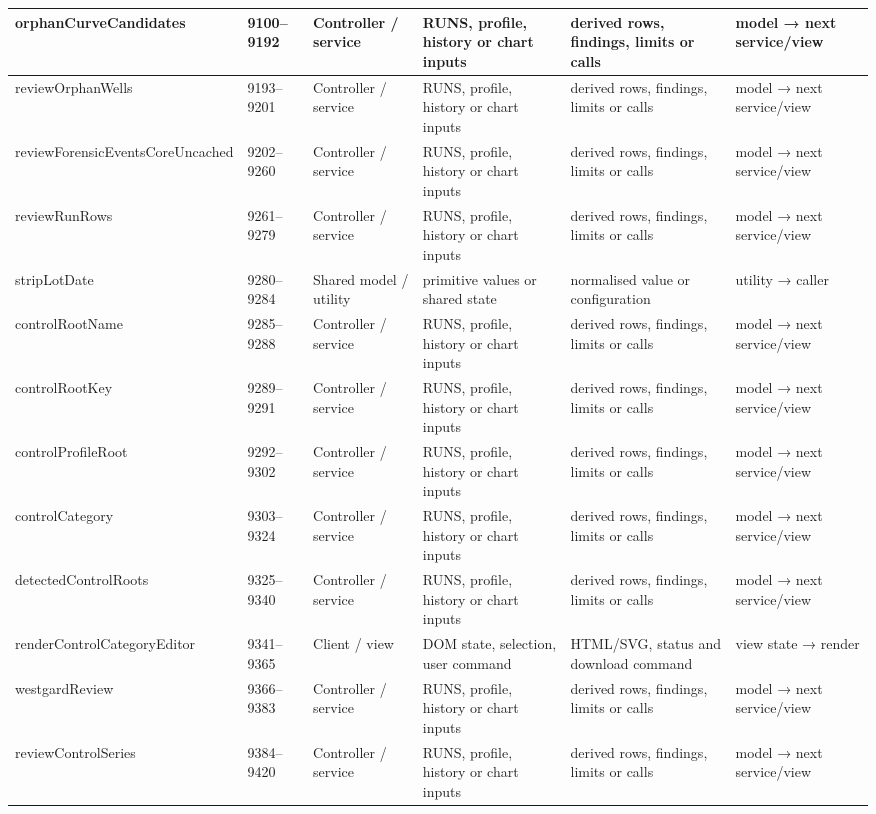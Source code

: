 \begin{landscape}
\begin{longtable}{@{}p{3.2cm}p{1.45cm}p{2.7cm}p{4.0cm}p{4.0cm}p{3.0cm}@{}}
orphanCurveCandidates & 9100--9192 & Controller / service & RUNS, profile, history or chart inputs & derived rows, findings, limits or calls & model → next service/view \\\hline
reviewOrphanWells & 9193--9201 & Controller / service & RUNS, profile, history or chart inputs & derived rows, findings, limits or calls & model → next service/view \\\hline
reviewForensicEventsCoreUncached & 9202--9260 & Controller / service & RUNS, profile, history or chart inputs & derived rows, findings, limits or calls & model → next service/view \\\hline
reviewRunRows & 9261--9279 & Controller / service & RUNS, profile, history or chart inputs & derived rows, findings, limits or calls & model → next service/view \\\hline
stripLotDate & 9280--9284 & Shared model / utility & primitive values or shared state & normalised value or configuration & utility → caller \\\hline
controlRootName & 9285--9288 & Controller / service & RUNS, profile, history or chart inputs & derived rows, findings, limits or calls & model → next service/view \\\hline
controlRootKey & 9289--9291 & Controller / service & RUNS, profile, history or chart inputs & derived rows, findings, limits or calls & model → next service/view \\\hline
controlProfileRoot & 9292--9302 & Controller / service & RUNS, profile, history or chart inputs & derived rows, findings, limits or calls & model → next service/view \\\hline
controlCategory & 9303--9324 & Controller / service & RUNS, profile, history or chart inputs & derived rows, findings, limits or calls & model → next service/view \\\hline
detectedControlRoots & 9325--9340 & Controller / service & RUNS, profile, history or chart inputs & derived rows, findings, limits or calls & model → next service/view \\\hline
renderControlCategoryEditor & 9341--9365 & Client / view & DOM state, selection, user command & HTML/SVG, status and download command & view state → render \\\hline
westgardReview & 9366--9383 & Controller / service & RUNS, profile, history or chart inputs & derived rows, findings, limits or calls & model → next service/view \\\hline
reviewControlSeries & 9384--9420 & Controller / service & RUNS, profile, history or chart inputs & derived rows, findings, limits or calls & model → next service/view \\\hline

\end{longtable}
\end{landscape}
